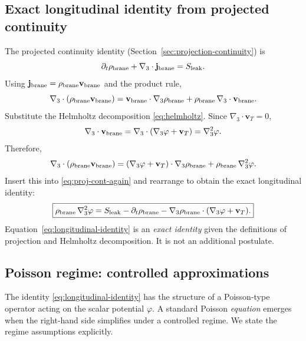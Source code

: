 \documentclass[11pt]{article}
\begin{document}
\subsection{Exact longitudinal identity from projected continuity}
\label{sec:poisson-exact}

The projected continuity identity (Section~\ref{sec:projection-continuity}) is
\begin{equation}
\partial_t \rho_{\rm brane} + \nabla_3\cdot \mathbf{j}_{\rm brane} = S_{\rm leak}.
\label{eq:proj-cont-again}
\end{equation}
Using $\mathbf{j}_{\rm brane}=\rho_{\rm brane}\mathbf{v}_{\rm brane}$ and the product rule,
\begin{equation}
\nabla_3\cdot(\rho_{\rm brane}\mathbf{v}_{\rm brane})
=
\mathbf{v}_{\rm brane}\cdot\nabla_3\rho_{\rm brane}
+
\rho_{\rm brane}\,\nabla_3\cdot\mathbf{v}_{\rm brane}.
\end{equation}
Substitute the Helmholtz decomposition \eqref{eq:helmholtz}. Since $\nabla_3\cdot\mathbf{v}_T=0$,
\begin{equation}
\nabla_3\cdot\mathbf{v}_{\rm brane}=\nabla_3\cdot(\nabla_3\varphi+\mathbf{v}_T)=\nabla_3^2\varphi.
\end{equation}
Therefore,
\begin{equation}
\nabla_3\cdot(\rho_{\rm brane}\mathbf{v}_{\rm brane})
=
(\nabla_3\varphi+\mathbf{v}_T)\cdot\nabla_3\rho_{\rm brane}
+
\rho_{\rm brane}\,\nabla_3^2\varphi.
\end{equation}
Insert this into \eqref{eq:proj-cont-again} and rearrange to obtain the exact longitudinal identity:
\begin{equation}
\boxed{
\rho_{\rm brane}\,\nabla_3^2\varphi
=
S_{\rm leak}
-
\partial_t \rho_{\rm brane}
-
\nabla_3\rho_{\rm brane}\cdot(\nabla_3\varphi+\mathbf{v}_T).
}
\label{eq:longitudinal-identity}
\end{equation}
Equation~\eqref{eq:longitudinal-identity} is an \emph{exact identity} given the definitions of projection and Helmholtz decomposition. It is not an additional postulate.

\subsection{Poisson regime: controlled approximations}
\label{sec:poisson-regime}

The identity \eqref{eq:longitudinal-identity} has the structure of a Poisson-type operator acting on the scalar potential $\varphi$. A standard Poisson \emph{equation} emerges when the right-hand side simplifies under a controlled regime. We state the regime assumptions explicitly.
\end{document}
